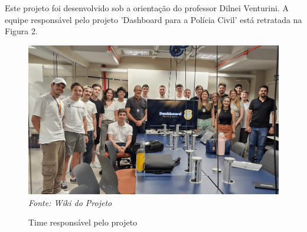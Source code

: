 Este projeto foi desenvolvido sob a orientação do professor Dilnei Venturini. A equipe responsável pelo projeto ’Dashboard para a Polícia Civil’ está retratada na Figura 2.


\begin{figure}[H]
    \centering
    \small
    \caption{Time responsável pelo projeto}
    \includegraphics[width=1\linewidth]{conteudo/3 - ages II/conteudo/figures/equipe-policia-civil.png}
    \textit{Fonte: Wiki do Projeto}
    \label{fig:projeto-time}
\end{figure}